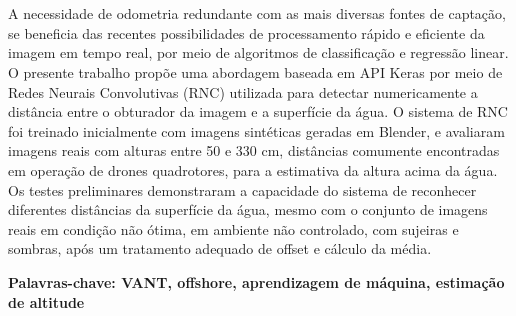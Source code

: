 \section*{} 
A necessidade de odometria redundante com as mais diversas fontes de captação, se beneficia das recentes possibilidades de processamento rápido e eficiente da imagem em tempo real, por meio de algoritmos de classificação e regressão linear. O presente trabalho propõe uma abordagem baseada em API Keras por meio de Redes Neurais Convolutivas (RNC) utilizada para detectar numericamente a distância entre o obturador da imagem e a superfície da água. O sistema de RNC foi treinado inicialmente com imagens sintéticas geradas em Blender, e avaliaram imagens reais com alturas entre 50 e 330 cm, distâncias comumente encontradas em operação de drones quadrotores, para a estimativa da altura acima da água. Os testes preliminares demonstraram a capacidade do sistema de reconhecer diferentes distâncias da superfície da água, mesmo com o conjunto de imagens reais em condição não ótima, em ambiente não controlado, com sujeiras e sombras, após um tratamento adequado de offset e cálculo da média.

{\bf Palavras-chave: VANT, offshore, aprendizagem de máquina, estimação de altitude} 


